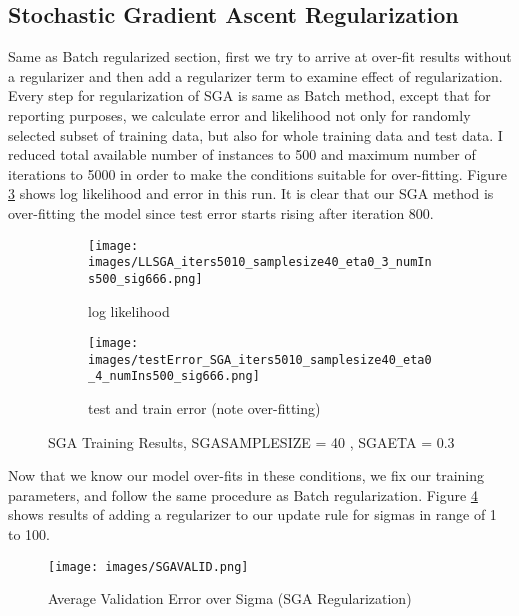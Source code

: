 \documentclass[a4paper,11pt]{article}
\begin{document}
\subsection*{Stochastic Gradient Ascent Regularization}
Same as Batch regularized section, first we try to arrive at over-fit results without a regularizer and then add a regularizer term to examine effect of regularization. Every step for regularization of SGA is same as Batch method, except that for reporting purposes, we calculate error and likelihood not only for randomly selected subset of training data, but also for whole training data and test data. I reduced total available number of instances to 500 and maximum number of iterations to 5000 in order to make the conditions suitable for over-fitting. Figure \ref{fig:SGA_overfit} shows log likelihood and error in this run. It is clear that our SGA method is over-fitting the model since test error starts rising after iteration 800.


\begin{figure}[t]
\begin{subfigure}{.5\textwidth}
  \texttt{[image: images/LLSGA\_iters5010\_samplesize40\_eta0\_3\_numIns500\_sig666.png]}
	\centering
  \caption{log likelihood }
  \label{fig:LLSGA_overfit}
\end{subfigure}
\begin{subfigure}{.5\textwidth}
  \texttt{[image: images/testError\_SGA\_iters5010\_samplesize40\_eta0\_4\_numIns500\_sig666.png]}
	\centering
  \caption{test and train error (note over-fitting) }
  \label{fig:SGA40_overfit_er}
\end{subfigure}
  \caption{SGA Training Results, SGA\underline{\hspace{.2cm}}SAMPLE\underline{\hspace{.2cm}}SIZE = 40 , SGA\underline{\hspace{.2cm}}ETA = 0.3}
  \label{fig:SGA_overfit}
\end{figure}
\newpage
Now that we know our model over-fits in these conditions, we fix our training parameters, and  follow the same procedure as Batch regularization. Figure \ref{fig:SGA_reg_valid} shows results of adding a regularizer to our update rule for sigmas in range of 1 to 100.

\begin{figure}[b]
  \texttt{[image: images/SGAVALID.png]}
	\centering
  \caption{Average Validation Error over Sigma (SGA Regularization) }
  \label{fig:SGA_reg_valid}
\end{figure}
\end{document}
